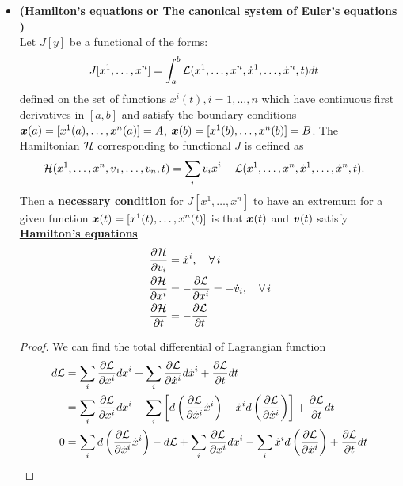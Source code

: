 \documentclass[11pt]{article}
\begin{document}
\begin{itemize}
\item \begin{theorem} \textbf{(Hamilton's equations or The canonical system of Euler's equations )}  \citep{gelfand2000calculus}\\
Let $J[y]$ be a functional of the forms:
\begin{align}
J[x^1, \ldots, x^n] &=\int_{a}^{b}{\mathcal L}(x^1, \ldots, x^n, \dot{x}^1, \ldots, \dot{x}^{n}, t) dt  \label{eqn: lagrangian_functional}
\end{align} defined on the set of functions $x^{i}(t), i=1,\ldots, n$ which have continuous first derivatives in $[a, b]$ and satisfy the boundary conditions $\boldsymbol{x}(a) = [x^{1}(a), \ldots, x^{n}(a)] = A$, $\boldsymbol{x}(b) = [x^{1}(b), \ldots, x^{n}(b)] = B$. The Hamiltonian ${\mathcal H}$ corresponding to functional $J$ is defined as 
\begin{align*}
{\mathcal H}(x^1, \ldots, x^n, v_{1}, \ldots,  v_{n}, t) &= \sum_{i}v_i \dot{x}^{i} -  {\mathcal L}(x^1, \ldots, x^n, \dot{x}^{1}, \ldots,  \dot{x}^{n}, t) .
\end{align*}
Then a \textbf{necessary condition} for $J[x^1, \ldots, x^n]$ to have an extremum for a given function $\boldsymbol{x}(t) = [x^{1}(t), \ldots, x^{n}(t)]$ is that $\boldsymbol{x}(t)$ and $\boldsymbol{v}(t)$ satisfy  \underline{\textbf{Hamilton's equations}}
\begin{align}
\frac{\partial {\mathcal H}}{ \partial v_{i}} &=  \dot{x}^{i}, \quad \forall\,i \label{eqn: Hamilton_equation_1}\\
\frac{\partial {\mathcal H}}{ \partial x^{i}} &= - \frac{\partial {\mathcal L}}{ \partial x^{i}} = - \dot{v}_{i}, \quad \forall\,i \label{eqn: Hamilton_equation_2}\\
\frac{\partial {\mathcal H}}{ \partial t} &=  - \frac{\partial {\mathcal L}}{ \partial t} \label{eqn: Hamilton_equation_3}
\end{align} 
\end{theorem}
\begin{proof} We can find the total differential of Lagrangian function
\begin{align*}
d\cL &= \sum_{i}\partdiff{\cL}{x^{i}}dx^{i} +  \sum_{i}\partdiff{\cL}{\dot{x}^{i}}d\dot{x}^{i} + \partdiff{\cL}{t}dt \\
&=  \sum_{i}\partdiff{\cL}{x^{i}}dx^{i} +  \sum_{i}\brac{d\paren{\partdiff{\cL}{\dot{x}^{i}}\dot{x}^{i}} - \dot{x}^{i}d\paren{\partdiff{\cL}{\dot{x}^{i}}} } + \partdiff{\cL}{t}dt \\
0&=\sum_{i}d\paren{\partdiff{\cL}{\dot{x}^{i}}\dot{x}^{i}} - d\cL +  \sum_{i}\partdiff{\cL}{x^{i}}dx^{i} -  \sum_{i} \dot{x}^{i}d\paren{\partdiff{\cL}{\dot{x}^{i}}} + \partdiff{\cL}{t}dt \\

\end{align*}
\end{proof}
\end{itemize}
\end{document}
